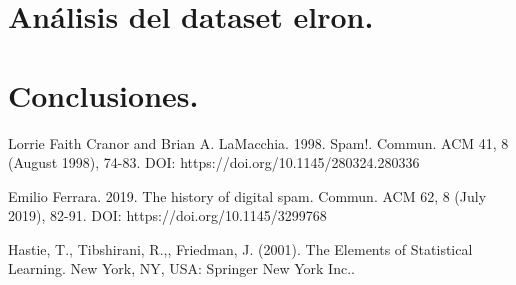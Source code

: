 \documentclass[12pt, letterpaper]{article}
\begin{document}
\section{Análisis del dataset elron.}

\section{Conclusiones.}

\begin{thebibliography}{1}

Lorrie Faith Cranor and Brian A. LaMacchia. 1998. Spam!. Commun. ACM 41, 8 (August 1998), 74-83. DOI: https://doi.org/10.1145/280324.280336

Emilio Ferrara. 2019. The history of digital spam. Commun. ACM 62, 8 (July 2019), 82-91. DOI: https://doi.org/10.1145/3299768

Hastie, T., Tibshirani, R.,, Friedman, J. (2001). The Elements of Statistical Learning. New York, NY, USA: Springer New York Inc.. 

\end{thebibliography}
\end{document}
